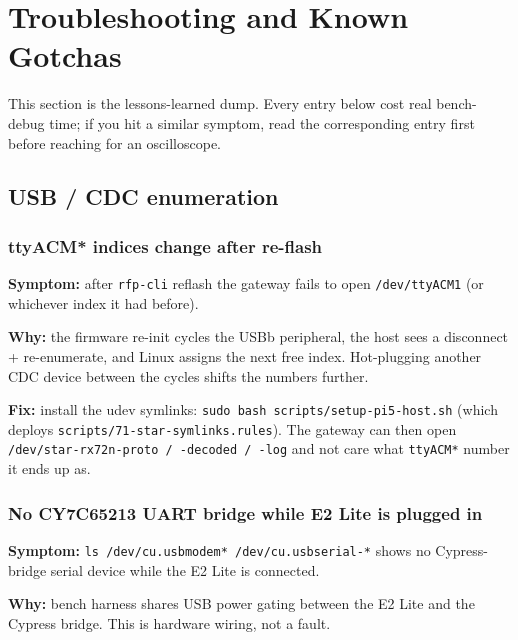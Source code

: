 
\section{Troubleshooting and Known Gotchas}
\label{section:troubleshooting}

This section is the lessons-learned dump. Every entry below cost
real bench-debug time; if you hit a similar symptom, read the
corresponding entry first before reaching for an oscilloscope.

\subsection{USB / CDC enumeration}

\subsubsection{ttyACM* indices change after re-flash}

\textbf{Symptom:} after \texttt{rfp-cli} reflash the gateway
fails to open \texttt{/dev/ttyACM1} (or whichever index it had
before).

\textbf{Why:} the firmware re-init cycles the USBb peripheral, the
host sees a disconnect + re-enumerate, and Linux assigns the next
free index. Hot-plugging another CDC device between the cycles
shifts the numbers further.

\textbf{Fix:} install the udev symlinks:
\texttt{sudo bash scripts/setup-pi5-host.sh} (which deploys
\texttt{scripts/71-star-symlinks.rules}). The gateway can then
open \texttt{/dev/star-rx72n-proto / -decoded / -log} and not
care what \texttt{ttyACM*} number it ends up as.

\subsubsection{No CY7C65213 UART bridge while E2 Lite is plugged in}

\textbf{Symptom:} \texttt{ls /dev/cu.usbmodem* /dev/cu.usbserial-*}
shows no Cypress-bridge serial device while the E2 Lite is connected.

\textbf{Why:} bench harness shares USB power gating between the
E2 Lite and the Cypress bridge. This is hardware wiring, not a
fault.

